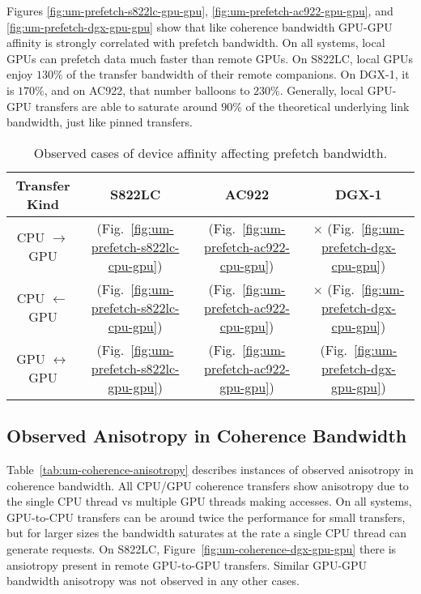 Figures \ref{fig:um-prefetch-s822lc-gpu-gpu}, \ref{fig:um-prefetch-ac922-gpu-gpu}, and \ref{fig:um-prefetch-dgx-gpu-gpu} show that like coherence bandwidth GPU-GPU affinity is strongly correlated with prefetch bandwidth.
On all systems, local GPUs can prefetch data much faster than remote GPUs.
On S822LC, local GPUs enjoy $130\%$ of the transfer bandwidth of their remote companions.
On DGX-1, it is $170\%$, and on AC922, that number balloons to $230\%$.
Generally, local GPU-GPU transfers are able to saturate around $90$\% of the theoretical underlying link bandwidth, just like pinned transfers.

\begin{table}[ht]
	\centering
	\caption[Device Affinity and prefetch Bandwidth]{
		Observed cases of device affinity affecting prefetch bandwidth.
	}
	\label{tab:um-prefetch-affinity}
	\begin{tabular}{cccc}
		\hline
		\textbf{Transfer Kind}    & \textbf{S822LC}                                        & \textbf{AC922}                                        & \textbf{DGX-1}                                      \\ \hline 
		CPU $\rightarrow$     GPU & \checkmark (Fig.~\ref{fig:um-prefetch-s822lc-cpu-gpu}) & \checkmark (Fig.~\ref{fig:um-prefetch-ac922-cpu-gpu}) & $\times$   (Fig.~\ref{fig:um-prefetch-dgx-cpu-gpu}) \\ \hline
		CPU $\leftarrow$      GPU & \checkmark (Fig.~\ref{fig:um-prefetch-s822lc-cpu-gpu}) & \checkmark (Fig.~\ref{fig:um-prefetch-ac922-cpu-gpu}) & $\times$   (Fig.~\ref{fig:um-prefetch-dgx-cpu-gpu}) \\ \hline
		GPU $\leftrightarrow$ GPU & \checkmark (Fig.~\ref{fig:um-prefetch-s822lc-gpu-gpu}) & \checkmark (Fig.~\ref{fig:um-prefetch-ac922-gpu-gpu}) & \checkmark (Fig.~\ref{fig:um-prefetch-dgx-gpu-gpu}) \\ \hline
	\end{tabular}
\end{table}

\subsection{Observed Anisotropy in Coherence Bandwidth}

Table~\ref{tab:um-coherence-anisotropy} describes instances of observed anisotropy in coherence bandwidth.
All CPU/GPU coherence transfers show anisotropy due to the single CPU thread vs multiple GPU threads making accesses.
On all systems, GPU-to-CPU transfers can be around twice the performance for small transfers, but for larger sizes the bandwidth saturates at the rate a single CPU thread can generate requests.
On S822LC, Figure~\ref{fig:um-coherence-dgx-gpu-gpu} there is ansiotropy present in remote GPU-to-GPU transfers.
Similar GPU-GPU bandwidth anisotropy was not observed in any other cases.

